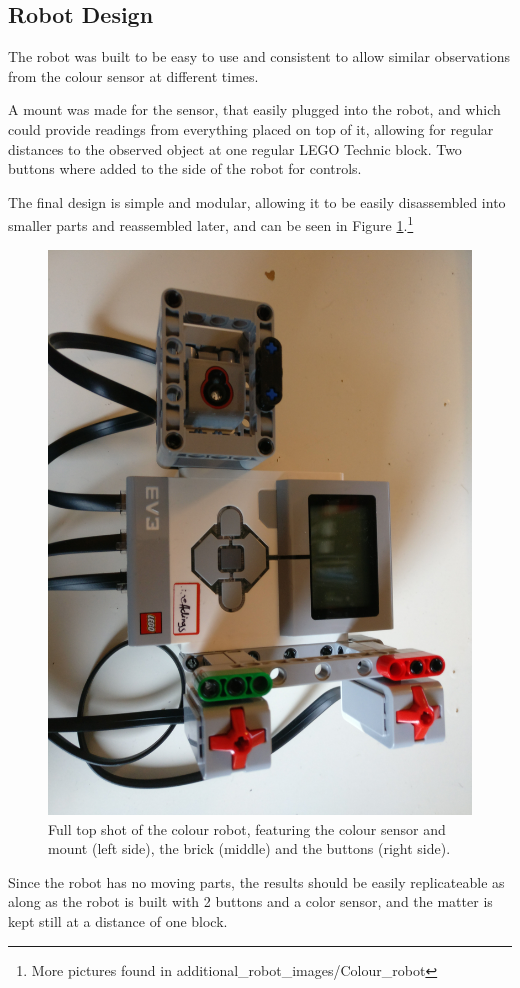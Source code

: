 \documentclass[11pt, a4paper]{article}
\begin{document}
\subsection{Robot Design}
The robot was built to be easy to use and consistent to allow similar observations from the colour sensor at different times.

A mount was made for the sensor, that easily plugged into the robot, and which could provide readings from everything placed on top of it, allowing for regular distances to the observed object at one regular LEGO Technic block. Two buttons where added to the side of the robot for controls.

The final design is simple and modular, allowing it to be easily disassembled into smaller parts and reassembled later, and can be seen in Figure \ref{fig:colour_robot_full_shot}.\footnote{More pictures found in additional\_robot\_images/Colour\_robot}

\begin{figure}[H]
	\centering
	\includegraphics[scale=0.05,angle=90]{images/colour_robot_full.jpg} 	
	\caption{Full top shot of the colour robot, featuring the colour sensor and mount (left side), the brick (middle) and the buttons (right side).}
	\label{fig:colour_robot_full_shot}
\end{figure}
Since the robot has no moving parts, the results should be easily replicateable as along as the robot is built with 2 buttons and a color sensor, and the matter is kept still at a distance of one block.
\end{document}
